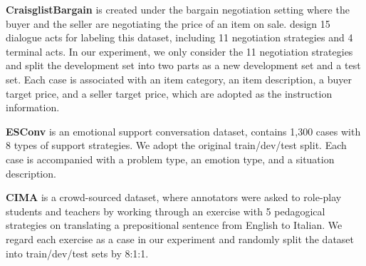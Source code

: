 \documentclass{article} %
\begin{document}
\noindent \textbf{CraisglistBargain}
\citep{emnlp18-negotiate} is created under the bargain negotiation setting where the buyer and the seller are negotiating the price of an item on sale. \citet{acl21-negotiate-tom} design 15 dialogue acts for labeling this dataset, including 11 negotiation strategies and 4 terminal acts. In our experiment, we only consider the 11 negotiation strategies and split the development set into two parts as a new development set and a test set. Each case is associated with an item category, an item description, a buyer target price, and a seller target price, which are adopted as the instruction information. 


\noindent \textbf{ESConv} 
\citep{esconv} is an emotional support conversation dataset, contains 1,300 cases with 8 types of support strategies. We adopt the original train/dev/test split. Each case is accompanied with a problem type, an emotion type, and a situation description. 



\noindent \textbf{CIMA} \citep{cima} is a crowd-sourced dataset, where annotators were asked to role-play students and teachers by working through an exercise with 5 pedagogical strategies on translating a prepositional sentence from English to Italian. We regard each exercise as a case in our experiment and randomly split the dataset into train/dev/test sets by 8:1:1. 
\end{document}
